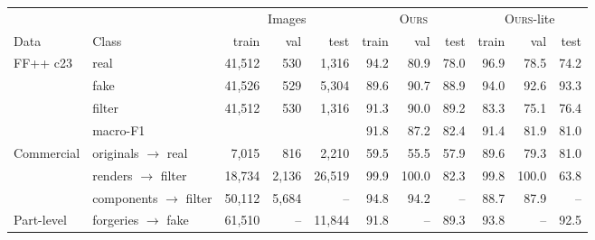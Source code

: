 \documentclass[border=4pt]{standalone}
\newcommand{\ours}{\textsc{Ours}}
\begin{document}
\Large
\begin{tabular}{@{}llrrr|rrr|rrr@{}}
\toprule
 & & \multicolumn{3}{c|}{Images} & \multicolumn{3}{c|}{\ours{}} & \multicolumn{3}{c}{\ours{}-lite} \\
Data & Class & train & val & test & train & val & test & train & val & test \\
\midrule
FF++ c23 & real & 41,512 & 530 & 1,316 & 94.2 & 80.9 & 78.0 & 96.9 & 78.5 & 74.2 \\
 & fake & 41,526 & 529 & 5,304 & 89.6 & 90.7 & 88.9 & 94.0 & 92.6 & 93.3 \\
 & filter & 41,512 & 530 & 1,316 & 91.3 & 90.0 & 89.2 & 83.3 & 75.1 & 76.4 \\
 & macro-F1 &  &  &  & 91.8 & 87.2 & 82.4 & 91.4 & 81.9 & 81.0 \\
\midrule
Commercial & originals $\to$ real & 7,015 & 816 & 2,210 & \cellcolor{fail}59.5 & \cellcolor{fail}55.5 & \cellcolor{fail}57.9 & 89.6 & 79.3 & 81.0 \\
 & renders $\to$ filter & 18,734 & 2,136 & 26,519 & 99.9 & 100.0 & 82.3 & 99.8 & 100.0 & 63.8 \\
 & components $\to$ filter & 50,112 & 5,684 & -- & 94.8 & 94.2 & -- & 88.7 & 87.9 & -- \\
\midrule
Part-level & forgeries $\to$ fake & 61,510 & -- & 11,844 & 91.8 & -- & 89.3 & 93.8 & -- & 92.5 \\
\bottomrule
\end{tabular}
\end{document}
